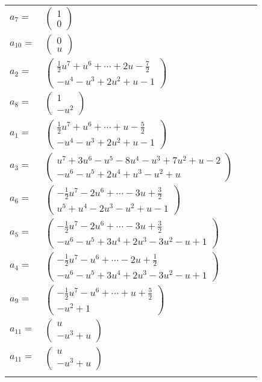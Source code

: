 \documentclass[1p]{elsarticle_modified}
\theoremstyle{definition}
\begin{document}
\begin{tabular}{m{7pt} m{180pt} m{7pt} m{180pt} }
\flushright $a_{7}=$&$\begin{pmatrix}1\\0\end{pmatrix}$ \\
\flushright $a_{10}=$&$\begin{pmatrix}0\\u\end{pmatrix}$ \\
\flushright $a_{2}=$&$\begin{pmatrix}\frac{1}{2} u^7+u^6+\cdots+2 u-\frac{7}{2}\\- u^4- u^3+2 u^2+u-1\end{pmatrix}$ \\
\flushright $a_{8}=$&$\begin{pmatrix}1\\- u^2\end{pmatrix}$ \\
\flushright $a_{1}=$&$\begin{pmatrix}\frac{1}{2} u^7+u^6+\cdots+u-\frac{5}{2}\\- u^4- u^3+2 u^2+u-1\end{pmatrix}$ \\
\flushright $a_{3}=$&$\begin{pmatrix}u^7+3 u^6- u^5-8 u^4- u^3+7 u^2+u-2\\- u^6- u^5+2 u^4+u^3- u^2+u\end{pmatrix}$ \\
\flushright $a_{6}=$&$\begin{pmatrix}-\frac{1}{2} u^7-2 u^6+\cdots-3 u+\frac{3}{2}\\u^5+u^4-2 u^3- u^2+u-1\end{pmatrix}$ \\
\flushright $a_{5}=$&$\begin{pmatrix}-\frac{1}{2} u^7-2 u^6+\cdots-3 u+\frac{3}{2}\\- u^6- u^5+3 u^4+2 u^3-3 u^2- u+1\end{pmatrix}$ \\
\flushright $a_{4}=$&$\begin{pmatrix}-\frac{1}{2} u^7- u^6+\cdots-2 u+\frac{1}{2}\\- u^6- u^5+3 u^4+2 u^3-3 u^2- u+1\end{pmatrix}$ \\
\flushright $a_{9}=$&$\begin{pmatrix}-\frac{1}{2} u^7- u^6+\cdots+u+\frac{5}{2}\\- u^2+1\end{pmatrix}$ \\
\flushright $a_{11}=$&$\begin{pmatrix}u\\- u^3+u\end{pmatrix}$\\ \flushright $a_{11}=$&$\begin{pmatrix}u\\- u^3+u\end{pmatrix}$\\&\end{tabular}
\end{document}

